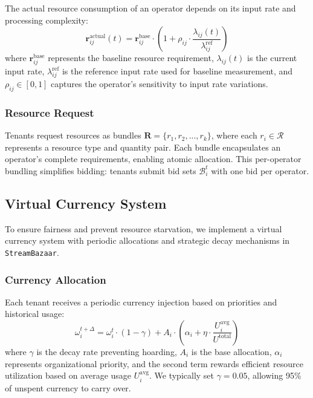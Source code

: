 \documentclass[lettersize,journal]{IEEEtran}
\begin{document}
The actual resource consumption of an operator depends on its input rate and processing complexity:
\begin{equation}
\label{eq:actual_resource}
\mathbf{r}_{ij}^{\text{actual}}(t) = \mathbf{r}_{ij}^{\text{base}} \cdot \left(1 + \rho_{ij} \cdot \frac{\lambda_{ij}(t)}{\lambda_{ij}^{\text{ref}}}\right)
\end{equation}
where $\mathbf{r}_{ij}^{\text{base}}$ represents the baseline resource requirement, $\lambda_{ij}(t)$ is the current input rate, $\lambda_{ij}^{\text{ref}}$ is the reference input rate used for baseline measurement, and $\rho_{ij} \in [0, 1]$ captures the operator's sensitivity to input rate variations.


\subsubsection{Resource Request} 
Tenants request resources as bundles $\mathbf{R} = \{r_1, r_2, ..., r_k\}$, where each $r_i \in \mathcal{R}$ represents a resource type and quantity pair. Each bundle encapsulates an operator's complete requirements, enabling atomic allocation. This per-operator bundling simplifies bidding: tenants submit bid sets $\mathcal{B}_i^t$ with one bid per operator.
\subsection{Virtual Currency System}
\label{subsec:currency_system}

To ensure fairness and prevent resource starvation, we implement a virtual currency system with periodic allocations and strategic decay mechanisms in \texttt{StreamBazaar}.

\subsubsection{Currency Allocation}
\label{ssub:currency_allocation}

Each tenant receives a periodic currency injection based on priorities and historical usage:
\begin{equation}
\label{eq:currency_allocation}
\omega_i^{t+\Delta} = \omega_i^t \cdot (1 - \gamma) + A_i \cdot \left(\alpha_i + \eta \cdot \frac{U_i^{\text{avg}}}{U^{\text{total}}}\right)
\end{equation}
where $\gamma$ is the decay rate preventing hoarding, $A_i$ is the base allocation, $\alpha_i$ represents organizational priority, and the second term rewards efficient resource utilization based on average usage $U_i^{\text{avg}}$. We typically set $\gamma = 0.05$, allowing 95\% of unspent currency to carry over.
\end{document}
